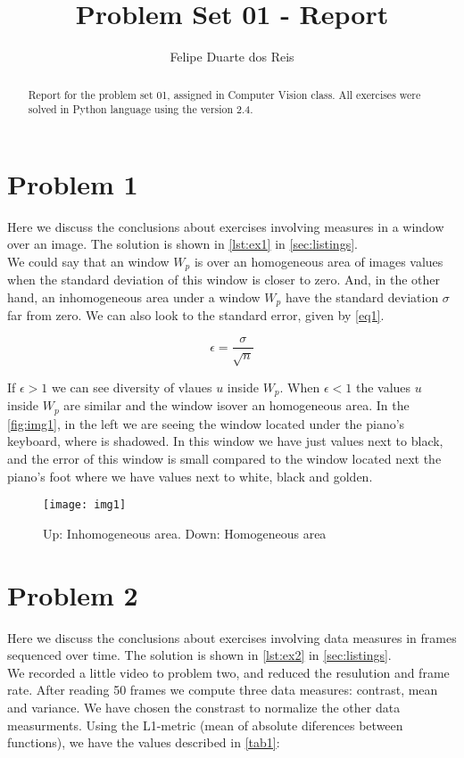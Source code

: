 \documentclass[a4paper,10pt]{article}
\title{Problem Set 01 - Report}
\author{Felipe Duarte dos Reis}
\begin{document}
\maketitle

\begin{abstract}
Report for the problem set 01, assigned in Computer Vision class. All exercises were solved in Python language using the
version 2.4.
\end{abstract}

\section{Problem 1}
Here we discuss the conclusions about exercises involving measures in a window over an image. 
The solution is shown in \autoref{lst:ex1} in \autoref{sec:listings}. \\
We could say that an window $W_p$ is over an homogeneous area of images values when the standard deviation of this window is closer to 
zero. And, in the other hand, an inhomogeneous area under a window $W_p$ have the standard deviation $\sigma$ far from zero.
We can also look to the standard error, given by \autoref{eq1}.

\begin{equation}
\label{eq1}
  \epsilon = \frac{\sigma}{\sqrt{n}}
\end{equation}

If $\epsilon > 1$ we can see diversity of vlaues $u$ inside $W_p$. 
When $\epsilon < 1$ the values $u$ inside $W_p$ are similar and the window isover an homogeneous area.
In the \autoref{fig:img1}, in the left we are seeing the window located under the piano's keyboard, where is shadowed.
In this window we have just values next to black, and the error of
this window is small compared to the window located next the piano's foot where we have values next to white, black and golden.

\begin{figure}[H]
\centering
\caption{Up: Inhomogeneous area. Down: Homogeneous area}
\label{fig:img1}
\texttt{[image: img1]}
\end{figure}


\section{Problem 2}
Here we discuss the conclusions about exercises involving data measures in frames sequenced over time. 
The solution is shown in \autoref{lst:ex2} in \autoref{sec:listings}. \\
We recorded a little video to problem two, and reduced the resulution and frame rate. 
After reading 50 frames we compute three data measures: contrast, mean and variance. 
We have chosen the constrast  to normalize the other data measurments.
Using the L1-metric (mean of absolute diferences between functions), we have the values described in \autoref{tab1}:
\end{document}
